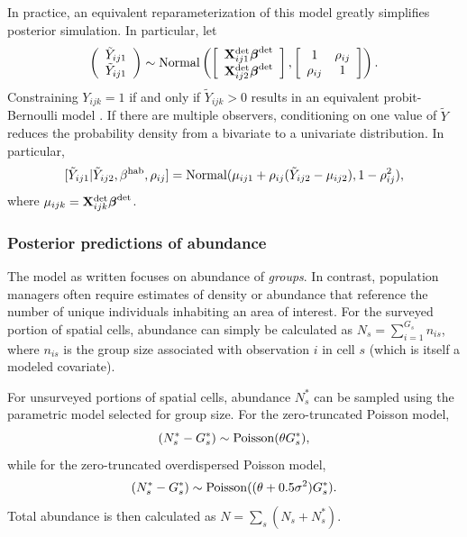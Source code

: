 \documentclass[10pt]{article}
\begin{document}
In practice, an equivalent reparameterization of this model greatly simplifies posterior simulation. In particular, let
\begin{equation} \label{eq:obs.mod}
\left(\begin{array}{c}
				\tilde{Y}_{ij1} \\
				\tilde{Y}_{ij1}
		\end{array}\right) \sim {\rm Normal}
\left( \left[ \begin{array}{c}
				{\bf X}_{ij1}^{\rm det} \boldsymbol{\beta}^{\rm det}\\
				{\bf X}_{ij2}^{\rm det} \boldsymbol{\beta}^{\rm det}
		\end{array}\right],
        \left[ \begin{array}{cc}
            1 & \rho_{ij} \\
            \rho_{ij} & 1
        \end{array} \right]
\right).
\end{equation}
Constraining $Y_{ijk}=1$ if and only if $\tilde{Y}_{ijk}>0$ results in an equivalent probit-Bernoulli model  \cite{AlbertChib1993}.
If there are multiple observers, conditioning on one value of $\tilde{Y}$ reduces the probability density from a bivariate to a univariate distribution.  In particular,
\begin{equation}
\label{eq:biv_to_univ}
[\tilde{Y}_{ij1} | \tilde{Y}_{ij2},\beta^{\rm hab},\rho_{ij}]={\rm Normal}(\mu_{ij1}+\rho_{ij}(\tilde{Y}_{ij2}-\mu_{ij2}),1-\rho_{ij}^2),
\end{equation}
where $\mu_{ijk}={\bf X}_{ijk}^{\rm det} \boldsymbol{\beta}^{\rm det}$.


\subsubsection*{Posterior predictions of abundance}

The model as written focuses on abundance of \emph{groups}.  In contrast, population managers often require estimates of density or abundance that reference the number of unique individuals inhabiting an area of interest.  For the surveyed portion of spatial cells, abundance can simply be calculated as $N_s=\sum_{i=1}^{G_s} n_{is}$, where $n_{is}$ is the group size associated with observation $i$ in cell $s$ (which is itself a modeled covariate).

For unsurveyed portions of spatial cells, abundance $N_s^*$ can be sampled using the parametric model selected for group size.  For the zero-truncated Poisson model,
$$(N_s^*-G_s^*) \sim {\rm Poisson}(\theta G_s^*),
$$
while for the zero-truncated overdispersed Poisson model,
$$(N_s^*-G_s^*) \sim {\rm Poisson}((\theta+0.5\sigma^2) G_s^*).$$
Total abundance is then calculated as $N=\sum_s (N_s+N_s^*)$.
\end{document}
